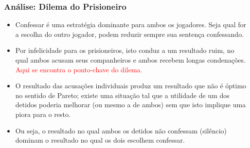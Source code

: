 \begin{frame}
    \frametitle{Análise: Dilema do Prisioneiro}

   \begin{itemize}
     \item Confessar é uma estratégia dominante para ambos os jogadores. Seja qual for a escolha do outro jogador, podem reduzir sempre sua sentença confessando. 
   
  \item Por infelicidade para os prisioneiros, isto conduz a um resultado ruim, no qual ambos acusam seus companheiros e ambos recebem longas condenações. \textcolor{red}{Aqui se encontra o ponto-chave do dilema.} 
  
  \item O resultado das acusações individuais produz um resultado que não é óptimo no sentido de Pareto; existe uma situação tal que a utilidade de um dos detidos poderia melhorar (ou mesmo a de ambos) sem que isto implique uma piora para o resto. 
  
  \item Ou seja, o resultado no qual ambos os detidos não confessam (silêncio) dominam o resultado no qual os dois escolhem confessar.

   \end{itemize}
   
\end{frame}




